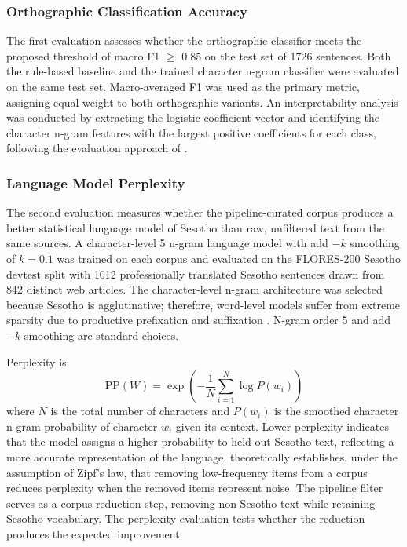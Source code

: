 \documentclass[12pt]{ThesisRU}
\begin{document}
\subsubsection{Orthographic Classification Accuracy}

The first evaluation assesses whether the orthographic classifier meets the proposed threshold of macro F1 $\geq$ 0.85 on the test set of 1726 sentences. Both the rule-based baseline and the trained character n-gram classifier were evaluated on the same test set. Macro-averaged F1 was used as the primary metric, assigning equal weight to both orthographic variants. An interpretability analysis was conducted by extracting the logistic coefficient vector and identifying the character n-gram features with the largest positive coefficients for each class, following the evaluation approach of \citet{de2024data}.

\subsubsection{Language Model Perplexity}

The second evaluation measures whether the pipeline-curated corpus produces a better statistical language model of Sesotho than raw, unfiltered text from the same sources. A character-level 5 n-gram language model with add $-k$ smoothing of $k=0.1$ was trained on each corpus and evaluated on the FLORES-200 Sesotho devtest split \citep{nllb2022} with 1012 professionally translated Sesotho sentences drawn from 842 distinct web articles. The character-level n-gram architecture was selected because Sesotho is agglutinative; therefore, word-level models suffer from extreme sparsity due to productive prefixation and suffixation \citep{kambarami2021computational}. N-gram order 5 and add $-k$ smoothing are standard choices.

Perplexity is 
\begin{equation}
    \text{PP}(W) = \exp\!\left(-\frac{1}{N} \sum_{i=1}^{N} \log P(w_i)\right)
\end{equation}
where $N$ is the total number of characters and $P(w_i)$ is the smoothed character n-gram probability of character $w_i$ given its context. Lower perplexity indicates that the model assigns a higher probability to held-out Sesotho text, reflecting a more accurate representation of the language. \citet{kobayashi2014perplexity} theoretically establishes, under the assumption of Zipf's law, that removing low-frequency items from a corpus reduces perplexity when the removed items represent noise. The pipeline filter serves as a corpus-reduction step, removing non-Sesotho text while retaining Sesotho vocabulary. The perplexity evaluation tests whether the reduction produces the expected improvement. 
\end{document}
